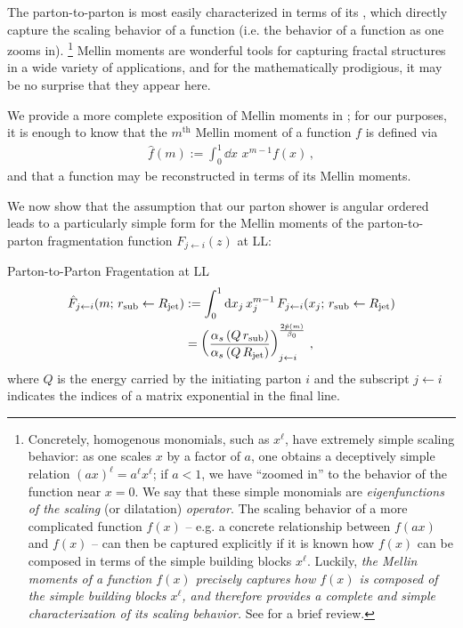 The \gls{parton-to-parton} is most easily characterized in terms of its , which directly capture the scaling behavior of a function (i.e. the behavior of a function as one zooms in).%
\footnote{
    Concretely, homogenous monomials, such as \(x^\ell\), have extremely simple scaling behavior:
    as one scales \(x\) by a factor of \(a\), one obtains a deceptively simple relation \((a x)^\ell = a^\ell x^\ell\);
    if \(a < 1\), we have ``zoomed in'' to the behavior of the function near \(x = 0\).
    We say that these simple monomials are \textit{eigenfunctions of the scaling} (or dilatation) \textit{operator}.
    The scaling behavior of a more complicated function \(f(x)\) -- e.g. a concrete relationship between \(f(ax)\) and \(f(x)\) -- can then be captured explicitly if it is known how \(f(x)\) can be composed in terms of the simple building blocks \(x^\ell\).
    Luckily, \textit{the Mellin moments of a function \(f(x)\) precisely captures how \(f(x)\) is composed of the simple building blocks \(x^\ell\), and therefore provides a complete and simple characterization of its scaling behavior.}
    See  for a brief review.
}
%
Mellin moments are wonderful tools for capturing fractal structures in a wide variety of applications, and for the mathematically prodigious, it may be no surprise that they appear here.


We provide a more complete exposition of Mellin moments in ;
%
for our purposes, it is enough to know that the \(m^\text{th}\) Mellin moment of a function \(f\) is defined via
\begin{align}
    \hat{f}(m) := \int_0^1 \dd x \,\, x^{m-1} f(x)
    \,,
\end{align}
and that a function may be reconstructed in terms of its Mellin moments.

We now show that the assumption that our parton shower is angular ordered leads to a particularly simple form for the Mellin moments of the parton-to-parton fragmentation function \(F_{j \leftarrow i}(z)\) at LL:

\begin{proposition}{Parton-to-Parton Fragentation at LL}{}
\begin{align}
    \label{eq:mellin_transform_defn}
    \hat{F}_{j \leftarrow i}(m;\,\rsub \leftarrow \Rjet)
    &:=
    \int_0^1 \dd x_j \, x_j^{m-1}
    \,
    F_{j \leftarrow i}(x_j;\,\rsub \leftarrow \Rjet)
    \\
    \label{eq:ll_fragmentation_function}
    &=
    \le(\frac{\alpha_s\le(Q\,\rsub\ri)}{\alpha_s\le(Q\,\Rjet\ri)}\ri)
    ^
    {\frac{2 \hat{p}(m)}{\beta_0}}
    _{j\leftarrow i}
    \,,
\end{align}
where \(Q\) is the energy carried by the initiating parton \(i\) and the subscript \(j \leftarrow i\) indicates the indices of a matrix exponential in the final line.
\end{proposition}



